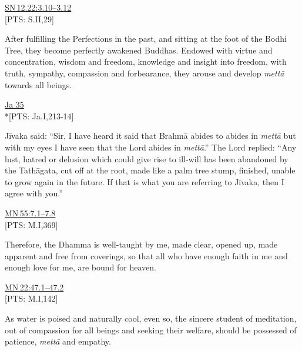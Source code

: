 \documentclass[10pt, openright]{book}
\begin{document}
\begin{flushright}
\href{https://suttacentral.net/sn12.22/en/sujato\#3.10}{SN 12.22:3.10–3.12}\\

[PTS: S.II,29]


\end{flushright}
After fulfilling the Perfections in the past, and sitting at the foot of the Bodhi Tree, they become perfectly awakened Buddhas. Endowed with virtue and concentration, wisdom and freedom, knowledge and insight into freedom, with truth, sympathy, compassion and forbearance, they arouse and develop \textit{mettā} towards all beings.


\begin{flushright}
\href{https://suttacentral.net/ja35/en/chalmers?reference=main/pts#pts-vp-pli213}{Ja 35}\\

*[PTS: Ja.I,213-14]


\end{flushright}
Jīvaka said: “Sir, I have heard it said that Brahmā abides to abides in \textit{mettā} but with my eyes I have seen that the Lord abides in \textit{mettā}.” The Lord replied: “Any lust, hatred or delusion which could give rise to ill-will has been abandoned by the Tathāgata, cut off at the root, made like a palm tree stump, finished, unable to grow again in the future. If that is what you are referring to Jīvaka, then I agree with you.”


\begin{flushright}
\href{https://suttacentral.net/mn55/en/sujato\#7.1}{MN 55:7.1–7.8}\\

[PTS: M.I,369]


\end{flushright}
Therefore, the Dhamma is well-taught by me, made clear, opened up, made apparent and free from coverings, so that all who have enough faith in me and enough love for me, are bound for heaven.


\begin{flushright}
\href{https://suttacentral.net/mn22/en/sujato\#47.1}{MN 22:47.1–47.2}\\

[PTS: M.I,142]


\end{flushright}
As water is poised and naturally cool, even so, the sincere student of meditation, out of compassion for all beings and seeking their welfare, should be possessed of patience, \textit{mettā} and empathy.
\end{document}
